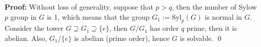 \documentclass[12pt]{article}
\begin{document}
\textbf{Proof:} Without loss of generality, suppose that $p>q$, then the number of Sylow $p$ group in $G$ is 1, which means that the group $G_{1}:=\text{Syl}_{p}(G)$ is normal in $G$. Consider the tower $G\supseteq G_{1}\supseteq\{e\}$, then $G/G_{1}$ has order $q$ prime, then it is abelian. Also, $G_{1}/\{e\}$ is abelian (prime order), hence $G$ is solvable. \qed
\end{document}
